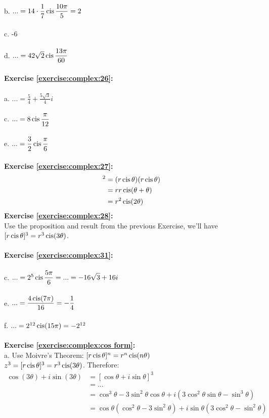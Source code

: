 b. $...=14\cdot \displaystyle\frac{1}{7}\operatorname{cis}\frac{10\pi}{5}=2$\\
\\
c. -6\\
\\
d. $...=42\sqrt{2}\operatorname{cis}\displaystyle\frac{13\pi}{60}$\\
\\
\textbf{Exercise \ref{exercise:complex:26}:}\\
\\
a. $...=\displaystyle\frac{5}{4}+\frac{5\sqrt{3}}{4}i$\\
\\
c. $...=8\operatorname{cis}\displaystyle\frac{\pi}{12}$\\
\\
e. $...=\displaystyle\frac{3}{2}\operatorname{cis}\displaystyle\frac{\pi}{6}$\\
\\
\textbf{Exercise \ref{exercise:complex:27}:}
\begin{align*}
[r\cis\theta]^{2} & = (r\cis\theta)(r\cis\theta)\\
& = rr\cis(\theta+\theta)\\
& = r^{2}\cis(2\theta)\\
\end{align*}
\textbf{Exercise \ref{exercise:complex:28}:}\\
Use the proposition and result from the previous Exercise, we'll have $[r\operatorname{cis}\theta]^{3}=r^{3}\operatorname{cis}(3\theta)$.\\
\\
\textbf{Exercise \ref{exercise:complex:31}:}\\
\\
c. $...=2^{5}\operatorname{cis}\displaystyle\frac{5\pi}{6}=...=-16\sqrt{3}+16i$\\
\\
e. $...=\displaystyle\frac{4\operatorname{cis}(7\pi)}{16}=-\frac{1}{4}$\\
\\
f. $...=2^{12}\operatorname{cis}(15\pi)=-2^{12}$\\
\\
\textbf{Exercise \ref{exercise:complex:cos form}:}\\
a. Use Moivre's Theorem: $[r\operatorname{cis}\theta]^{n}=r^{n}\operatorname{cis}(n\theta)$\\
$z^{3}=[r\operatorname{cis}\theta]^{3}=r^{3}\operatorname{cis}(3\theta)$. Therefore:
\begin{align*}
\cos(3\theta)+i\sin(3\theta) & =[\cos\theta+i\sin\theta]^{3}\\
& = ...\\
& = \cos^{3}\theta-3\sin^{2}\theta\cos\theta+i(3\cos^{2}\theta\sin\theta-\sin^{3}\theta)\\
& = \cos\theta(\cos^{2}\theta-3\sin^{2}\theta)+i\sin\theta(3\cos^{2}\theta-\sin^{2}\theta)\\
\end{align*}

